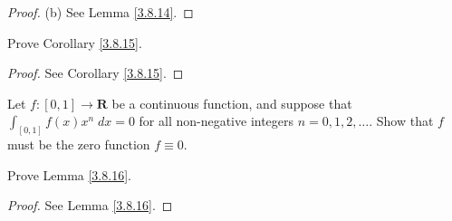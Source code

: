\begin{proof}{(b)}
    See Lemma \ref{3.8.14}.
\end{proof}

\begin{exercise}\label{ex 3.8.7}
    Prove Corollary \ref{3.8.15}.
\end{exercise}

\begin{proof}
    See Corollary \ref{3.8.15}.
\end{proof}

\begin{exercise}\label{ex 3.8.8}
    Let \(f : [0, 1] \to \mathbf{R}\) be a continuous function, and suppose that \(\int_{[0, 1]} f(x) x^n \; dx = 0\) for all non-negative integers \(n = 0, 1, 2, \dots\).
    Show that \(f\) must be the zero function \(f \equiv 0\).
\end{exercise}

\begin{exercise}\label{ex 3.8.9}
    Prove Lemma \ref{3.8.16}.
\end{exercise}

\begin{proof}
    See Lemma \ref{3.8.16}.
\end{proof}